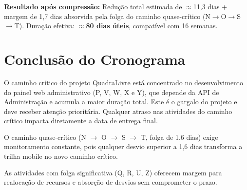 \documentclass[12pt,a4paper,oneside]{report}
\begin{document}
\textbf{Resultado após compressão:} Redução total estimada de $\approx$11,3 dias + margem de 1,7 dias absorvida pela folga do caminho quase-crítico (N$\rightarrow$O$\rightarrow$S$\rightarrow$T). Duração efetiva: \textbf{$\approx$80 dias úteis}, compatível com 16 semanas.

\section{Conclusão do Cronograma}

O caminho crítico do projeto QuadraLivre está concentrado no desenvolvimento do painel web administrativo (P, V, W, X e Y), que depende da API de Administração e acumula a maior duração total. Este é o gargalo do projeto e deve receber atenção prioritária. Qualquer atraso nas atividades do caminho crítico impacta diretamente a data de entrega final.

O caminho quase-crítico (N $\rightarrow$ O $\rightarrow$ S $\rightarrow$ T, folga de 1,6 dias) exige monitoramento constante, pois qualquer desvio superior a 1,6 dias transforma a trilha mobile no novo caminho crítico.

As atividades com folga significativa (Q, R, U, Z) oferecem margem para realocação de recursos e absorção de desvios sem comprometer o prazo.
\end{document}
